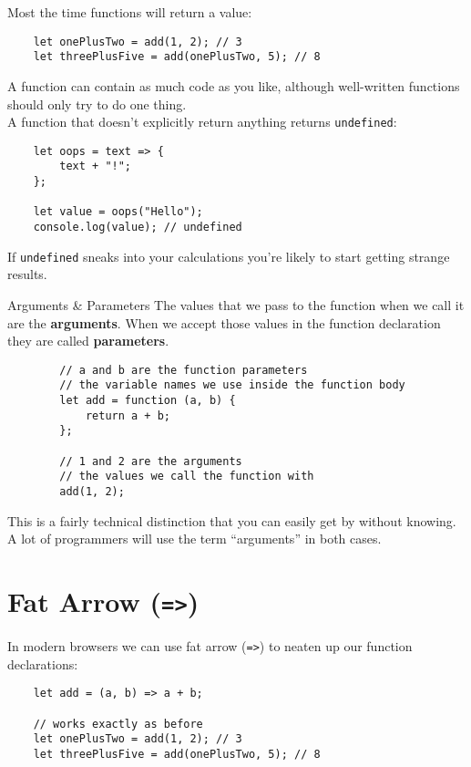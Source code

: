 Most the time functions will return a value:

\begin{verbatim}
    let onePlusTwo = add(1, 2); // 3
    let threePlusFive = add(onePlusTwo, 5); // 8
\end{verbatim}

A function can contain as much code as you like, although well-written functions should only try to do one thing.
\\

A function that doesn't explicitly return anything returns \texttt{undefined}:

\begin{verbatim}
    let oops = text => {
        text + "!";
    };

    let value = oops("Hello");
    console.log(value); // undefined
\end{verbatim}

If \texttt{undefined} sneaks into your calculations you're likely to start getting strange results.


\begin{infobox}{Arguments \& Parameters}
    The values that we pass to the function when we call it are the \textbf{arguments}. When we accept those values in the function declaration they are called \textbf{parameters}.

    \begin{verbatim}
        // a and b are the function parameters
        // the variable names we use inside the function body
        let add = function (a, b) {
            return a + b;
        };

        // 1 and 2 are the arguments
        // the values we call the function with
        add(1, 2);
    \end{verbatim}

    This is a fairly technical distinction that you can easily get by without knowing. A lot of programmers will use the term ``arguments'' in both cases.
\end{infobox}


\section{Fat Arrow (\texttt{=>})}

In modern browsers we can use fat arrow (\texttt{=>}) to neaten up our function declarations:

\begin{verbatim}
    let add = (a, b) => a + b;

    // works exactly as before
    let onePlusTwo = add(1, 2); // 3
    let threePlusFive = add(onePlusTwo, 5); // 8
\end{verbatim}

